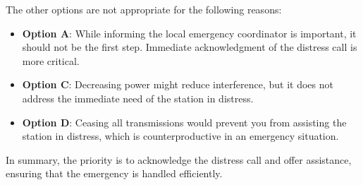 The other options are not appropriate for the following reasons:
\begin{itemize}
    \item \textbf{Option A}: While informing the local emergency coordinator is important, it should not be the first step. Immediate acknowledgment of the distress call is more critical.
    \item \textbf{Option C}: Decreasing power might reduce interference, but it does not address the immediate need of the station in distress.
    \item \textbf{Option D}: Ceasing all transmissions would prevent you from assisting the station in distress, which is counterproductive in an emergency situation.
\end{itemize}

In summary, the priority is to acknowledge the distress call and offer assistance, ensuring that the emergency is handled efficiently.

